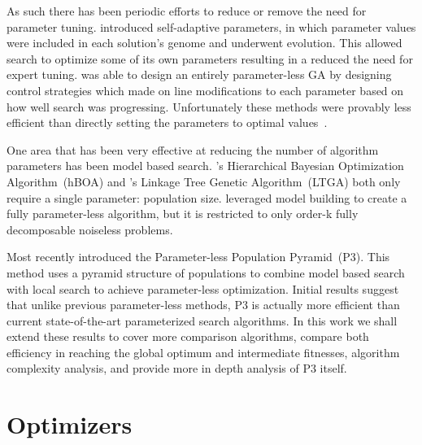 \documentclass[twoside]{article}
\begin{document}
As such there has been periodic efforts to reduce or remove the need for parameter tuning.
\cite{Back:1992:selfadapt} introduced self-adaptive parameters, in which parameter values
were included in each solution's genome and underwent evolution. This allowed search
to optimize some of its own parameters resulting in a reduced the need for expert tuning.
\cite{harik:1999:parameterlessga} was able to design an entirely parameter-less GA by
designing control strategies which made on line modifications to each parameter based
on how well search was progressing. Unfortunately these methods were provably less efficient
than directly setting the parameters to optimal values~\citep{pelikan:1999:worstparameter-less}.

One area that has been very effective at reducing the number of algorithm parameters has been
model based search. \cite{pelikan:2006:hboa}'s Hierarchical Bayesian Optimization
Algorithm~(hBOA) and \cite{thierens:2010:ltga}'s Linkage Tree Genetic Algorithm~(LTGA)
both only require a single parameter: population size. \cite{posik:2011:parameterless}
leveraged model building to create a fully parameter-less algorithm, but it is restricted to
only order-k fully decomposable noiseless problems.

Most recently \cite{goldman:2014:p3} introduced the Parameter-less Population Pyramid~(P3).
This method uses a pyramid structure of populations to combine model based search with local search
to achieve parameter-less optimization. Initial results suggest that unlike
previous parameter-less methods, P3 is actually more efficient than current state-of-the-art
parameterized search algorithms. In this work we shall extend these results to cover more
comparison algorithms, compare both efficiency in reaching the global optimum and intermediate
fitnesses, algorithm complexity analysis, and provide more in depth analysis of P3 itself.
\begin{comment}
Section~\ref{sec-optimizers}
explains how each of these algorithms, including P3, perform search. Section~\ref{sec-problems}
provides a description of each test problem. As hBOA and LTGA require a population size parameter
Section~\ref{sec-tuning} provides our methodology to ensure each is optimally tuned to each problem.
\end{comment}

\section{Optimizers}
\label{sec-optimizers}
\end{document}

